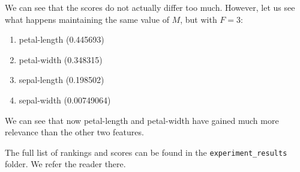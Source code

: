\documentclass[journal, a4paper]{IEEEtran}
\begin{document}
We can see that the scores do not actually differ too much. However, let us see what happens
maintaining the same value of $ M $, but with $ F = 3 $:

\begin{enumerate}
\item petal-length (0.445693)
\item petal-width (0.348315)
\item sepal-length (0.198502)
\item sepal-width (0.00749064)
\end{enumerate}

We can see that now petal-length and petal-width have gained much more relevance than the other
two features.

The full list of rankings and scores can be found in the \texttt{experiment\_results} folder. We
refer the reader there.

\end{document}

